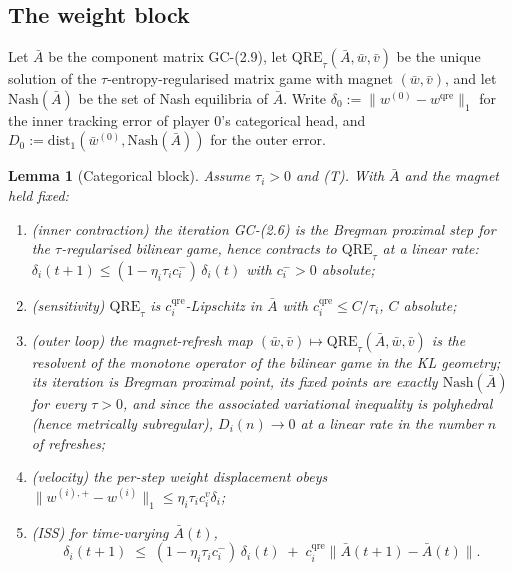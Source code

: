 \documentclass[11pt]{article}
\newtheorem{lemma}{Lemma}
\theoremstyle{definition}
\newcommand{\GC}[1]{\textsf{GC-#1}}
\begin{document}
\subsection{The weight block}

Let $\bar A$ be the component matrix \GC{(2.9)}, let
$\mathrm{QRE}_\tau(\bar A, \bar w, \bar v)$ be the unique solution of the
$\tau$-entropy-regularised matrix game with magnet $(\bar w, \bar v)$, and let
$\mathrm{Nash}(\bar A)$ be the set of Nash equilibria of $\bar A$. Write
$\delta_0 := \|w^{(0)} - w^{\mathrm{qre}}\|_1$ for the inner tracking error of
player $0$'s categorical head, and $D_0 := \mathrm{dist}_1(\bar w^{(0)},
\mathrm{Nash}(\bar A))$ for the outer error.

\begin{lemma}[Categorical block]\label{lem:weight}
Assume $\tau_i > 0$ and (T). With $\bar A$ and the magnet held fixed:
\begin{enumerate}
\item[(i)] \emph{(inner contraction)} the iteration \GC{(2.6)} is the Bregman
  proximal step for the $\tau$-regularised bilinear game, hence contracts to
  $\mathrm{QRE}_\tau$ at a linear rate: $\delta_i(t+1) \le
  (1 - \eta_i\tau_i c^-_i)\,\delta_i(t)$ with $c^-_i > 0$ absolute;
\item[(ii)] \emph{(sensitivity)} $\mathrm{QRE}_\tau$ is
  $c^{\mathrm{qre}}_i$-Lipschitz in $\bar A$ with $c^{\mathrm{qre}}_i \le C/\tau_i$,
  $C$ absolute;
\item[(iii)] \emph{(outer loop)} the magnet-refresh map $(\bar w,\bar v) \mapsto
  \mathrm{QRE}_\tau(\bar A, \bar w, \bar v)$ is the resolvent of the monotone
  operator of the bilinear game in the KL geometry; its iteration is Bregman
  proximal point, its fixed points are exactly $\mathrm{Nash}(\bar A)$ for every
  $\tau > 0$, and since the associated variational inequality is polyhedral
  (hence metrically subregular), $D_i(n) \to 0$ at a linear rate in the number
  $n$ of refreshes;
\item[(iv)] \emph{(velocity)} the per-step weight displacement obeys
  $\|w^{(i),+} - w^{(i)}\|_1 \le \eta_i\tau_i c^v_i \delta_i$;
\item[(v)] \emph{(ISS)} for time-varying $\bar A(t)$,
  \[
    \delta_i(t+1) \;\le\; (1 - \eta_i\tau_i c^-_i)\,\delta_i(t)
    \;+\; c^{\mathrm{qre}}_i \big\|\bar A(t+1) - \bar A(t)\big\| .
  \]
\end{enumerate}
\end{lemma}
\end{document}
